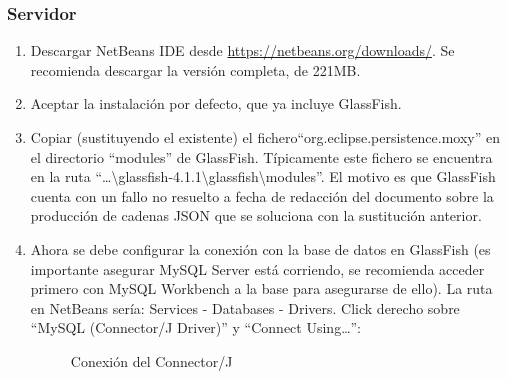 \subsubsection{Servidor}

\begin{enumerate}
	\item Descargar NetBeans IDE desde \url{https://netbeans.org/downloads/}. Se recomienda descargar la versión completa, de 221MB.
	\item Aceptar la instalación por defecto, que ya incluye GlassFish.
	\item Copiar (sustituyendo el existente) el fichero``org.eclipse.persistence.moxy'' en el directorio ``modules'' de GlassFish. Típicamente este fichero se encuentra en la ruta ``\dots\textbackslash glassfish-4.1.1\textbackslash glassfish\textbackslash modules''. El motivo es que GlassFish cuenta con un fallo no resuelto a fecha de redacción del documento sobre la producción de cadenas JSON que se soluciona con la sustitución anterior.
	\item Ahora se debe configurar la conexión con la base de datos en GlassFish (es importante asegurar MySQL Server está corriendo, se recomienda acceder primero con MySQL Workbench a la base para asegurarse de ello). La ruta en NetBeans sería: Services - Databases - Drivers. Click derecho sobre ``MySQL (Connector/J Driver)'' y ``Connect Using\dots'':
	\begin{figure} [!htb]
		\centering
		\caption{Conexión del Connector/J}
		\label{fig:server_1}
	\end{figure}

\end{enumerate}

